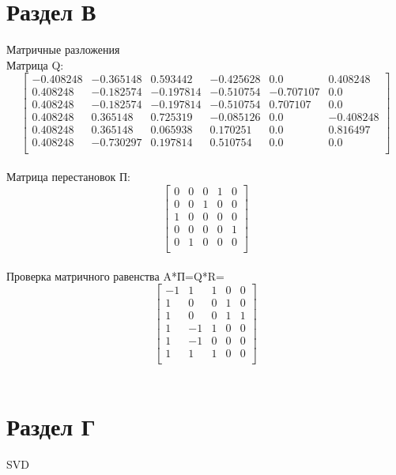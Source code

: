 \documentclass[13pt,a4paper]{scrartcl}
\begin{document}
\section{Раздел В}
Матричные разложения\\
Матрица Q:\\
$$
\left[
\begin{array}{cccccc}
-0.408248& -0.365148& 0.593442& -0.425628& 0.0& 0.408248\\
0.408248& -0.182574& -0.197814& -0.510754& -0.707107& 0.0\\
0.408248& -0.182574& -0.197814& -0.510754& 0.707107& 0.0\\
0.408248& 0.365148& 0.725319& -0.085126& 0.0& -0.408248\\
0.408248& 0.365148& 0.065938& 0.170251& 0.0& 0.816497\\
0.408248& -0.730297& 0.197814& 0.510754& 0.0& 0.0\\
\end{array}
\right]
$$\\

Матрица перестановок П:\\
$$
\left[
\begin{array}{ccccc}
0& 0& 0& 1& 0\\
0& 0& 1& 0& 0\\
1& 0& 0& 0& 0\\
0& 0& 0& 0& 1\\
0& 1& 0& 0& 0\\

\end{array}
\right]
$$\\

Проверка матричного равенства A*П=Q*R=\\
$$
\left[
\begin{array}{ccccc}
-1& 1& 1& 0& 0\\
1& 0& 0& 1& 0\\
1& 0& 0& 1& 1\\
1& -1& 1& 0& 0\\
1& -1& 0& 0& 0\\
1& 1& 1& 0& 0\\

\end{array}
\right]
$$\\


\section{Раздел Г}
SVD\\
\end{document}
